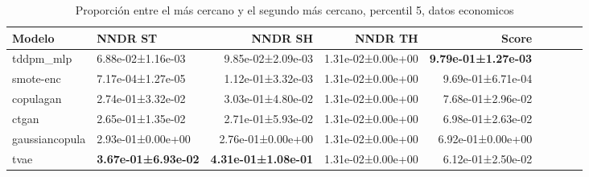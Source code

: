 \begin{table}[H]
\centering
\fontsize{10}{14}\selectfont
\caption{Proporción entre el más cercano y el segundo más cercano, percentil 5, datos economicos}
\label{table-dcr-economicos-a}
\begin{tabular}{|l|l|r|r|r|r|r|r|r|}
\hline
\rowcolor[gray]{0.8}
Modelo & NNDR ST & NNDR SH & NNDR TH & \textbf{Score} \\
\hline tddpm\_mlp & 6.88e-02±1.16e-03 & \cellcolor[rgb]{0.9, 0.54, 0.52} 9.85e-02±2.09e-03 & 1.31e-02±0.00e+00 & \bfseries 9.79e-01±1.27e-03 \\
\hline smote-enc & \cellcolor[rgb]{0.9, 0.54, 0.52} 7.17e-04±1.27e-05 & 1.12e-01±3.32e-03 & 1.31e-02±0.00e+00 & 9.69e-01±6.71e-04 \\
\hline copulagan & 2.74e-01±3.32e-02 & 3.03e-01±4.80e-02 & 1.31e-02±0.00e+00 & 7.68e-01±2.96e-02 \\
\hline ctgan & 2.65e-01±1.35e-02 & 2.71e-01±5.93e-02 & 1.31e-02±0.00e+00 & 6.98e-01±2.63e-02 \\
\hline gaussiancopula & 2.93e-01±0.00e+00 & 2.76e-01±0.00e+00 & 1.31e-02±0.00e+00 & 6.92e-01±0.00e+00 \\
\hline tvae & \bfseries 3.67e-01±6.93e-02 & \bfseries 4.31e-01±1.08e-01 & 1.31e-02±0.00e+00 & \cellcolor[rgb]{0.9, 0.54, 0.52} 6.12e-01±2.50e-02 \\
\hline
\end{tabular}
\end{table}

